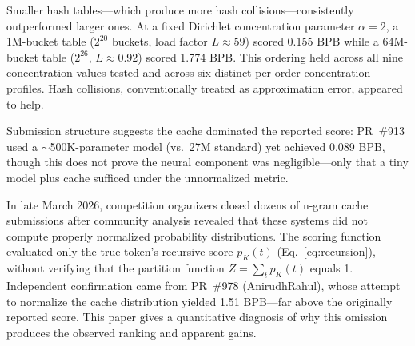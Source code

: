\documentclass[11pt]{article}
\begin{document}
Smaller hash tables---which produce more hash collisions---consistently outperformed larger ones. At a fixed Dirichlet concentration parameter $\alpha = 2$, a 1M-bucket table ($2^{20}$ buckets, load factor $L \approx 59$) scored 0.155 BPB while a 64M-bucket table ($2^{26}$, $L \approx 0.92$) scored 1.774 BPB. This ordering held across all nine concentration values tested and across six distinct per-order concentration profiles. Hash collisions, conventionally treated as approximation error, appeared to help.

Submission structure suggests the cache dominated the reported score: PR~\#913 used a ${\sim}$500K-parameter model (vs.\ 27M standard) yet achieved 0.089 BPB, though this does not prove the neural component was negligible---only that a tiny model plus cache sufficed under the unnormalized metric.

In late March 2026, competition organizers closed dozens of n-gram cache submissions after community analysis revealed that these systems did not compute properly normalized probability distributions. The scoring function evaluated only the true token's recursive score $p_K(t)$ (Eq.~\ref{eq:recursion}), without verifying that the partition function $Z = \sum_t p_K(t)$ equals 1. Independent confirmation came from PR~\#978 (AnirudhRahul), whose attempt to normalize the cache distribution yielded 1.51 BPB---far above the originally reported score. This paper gives a quantitative diagnosis of why this omission produces the observed ranking and apparent gains.
\end{document}
